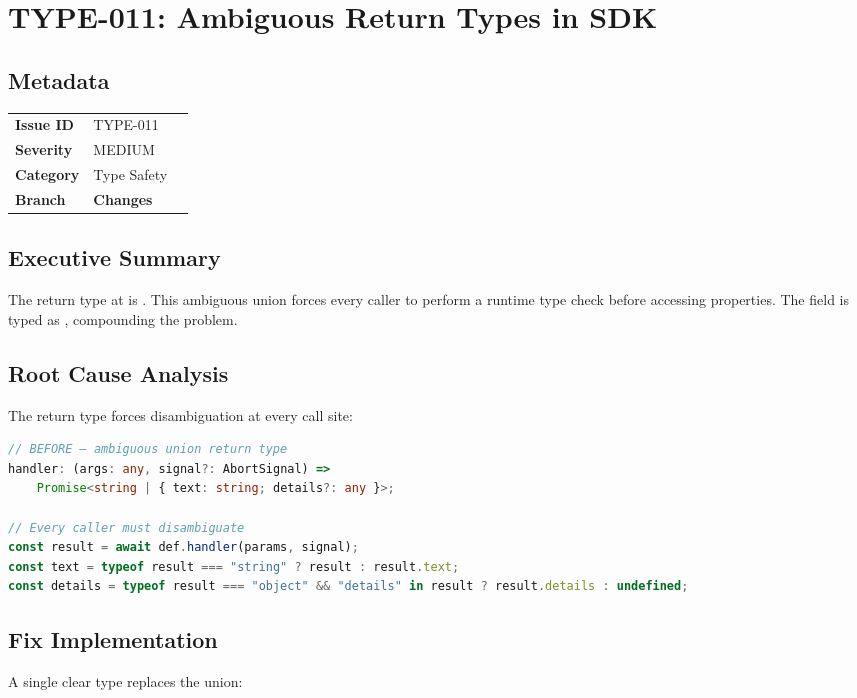 \section{TYPE-011: Ambiguous Return Types in SDK}
\label{sec:type-011}
\subsection*{Metadata}
\begin{tabular}{ll}
\textbf{Issue ID} & TYPE-011 \\
\textbf{Severity} & MEDIUM \\
\textbf{Category} & Type Safety \\
\textbf{Branch} & 
\textbf{Changes} &  \\
\end{tabular}

\subsection*{Executive Summary}
The  return type at  is . This ambiguous union forces every caller to perform a runtime type check before accessing properties. The  field is typed as , compounding the problem.

\subsection*{Root Cause Analysis}
The return type forces disambiguation at every call site:

\begin{lstlisting}[language=TypeScript]
// BEFORE — ambiguous union return type
handler: (args: any, signal?: AbortSignal) =>
    Promise<string | { text: string; details?: any }>;

// Every caller must disambiguate
const result = await def.handler(params, signal);
const text = typeof result === "string" ? result : result.text;
const details = typeof result === "object" && "details" in result ? result.details : undefined;
\end{lstlisting}

\subsection*{Fix Implementation}
A single clear  type replaces the union:

